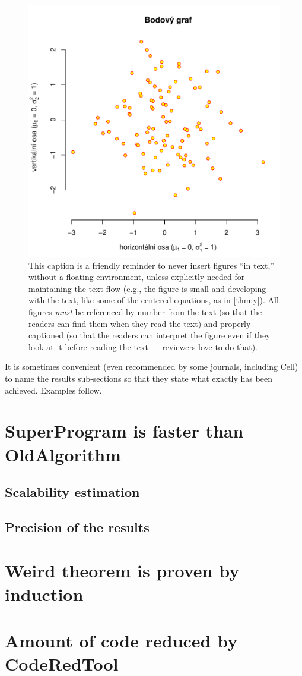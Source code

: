 \begin{figure}
\centering
\includegraphics[width=.6\linewidth]{img/ukazka-obr01.pdf}
\caption{This caption is a friendly reminder to never insert figures ``in text,'' without a floating environment, unless explicitly needed for maintaining the text flow (e.g., the figure is small and developing with the text, like some of the centered equations, as in \cref{thm:y}). All figures \emph{must} be referenced by number from the text (so that the readers can find them when they read the text) and properly captioned (so that the readers can interpret the figure even if they look at it before reading the text --- reviewers love to do that).}
\label{fig:f}
\end{figure}

It is sometimes convenient (even recommended by some journals, including Cell) to name the results sub-sections so that they state what exactly has been achieved. Examples follow.

\section{SuperProgram is faster than OldAlgorithm}
\subsection{Scalability estimation}
\subsection{Precision of the results}
\section{Weird theorem is proven by induction}
\section{Amount of code reduced by CodeRedTool}
